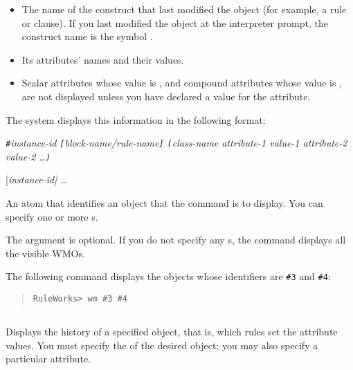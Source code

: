 {{\begin{itemize}
\item The name of the construct that last modified the object (for
  example, a rule or  clause). If you last modified the object
  at the interpreter prompt, the construct name is the symbol .

\item Its attributes' names and their values.

\item Scalar attributes whose value is , and compound attributes
  whose value is , are not displayed unless you have
  declared a  value for the attribute.
\end{itemize}

The system displays this information in the following format:

\verb|#|\it{instance-id} \verb|[|\it{block-name/rule-name}\verb|]| \verb|(|\it{class-name} \it{attribute-1} \it{value-1} \it{attribute-2} \it{value-2} \ldots\verb|)|

\Format

 [\it{instance-id}] \ldots

\begin{arguments}
\item[instance-id]

  An  atom that identifies an object that the command
  is to display. You can specify one or more s.

  The argument is optional. If you do not specify any s,
  the command displays all the visible WMOs.
\end{arguments}

\Example

The following command displays the objects whose identifiers are
\verb|#3| and \verb|#4|:

\begin{quote}
\begin{verbatim}
RuleWorks> wm #3 #4
\end{verbatim}
\end{quote}

\subsection{}

Displays the history of a specified object, that is, which rules set
the attribute values. You must specify the  of the desired
object; you may also specify a particular attribute.

}}
